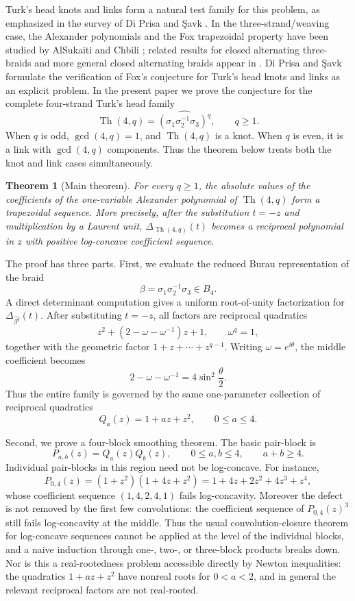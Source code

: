 \documentclass[11pt]{amsart}
\newtheorem{theorem}{Theorem}[section]
\newcommand{\Th}{\operatorname{Th}}
\begin{document}
Turk's head knots and links form a natural test family for this problem, as emphasized in the survey of Di Prisa and \c{S}avk \cite{diprisa-savk}.  In the three-strand/weaving case, the Alexander polynomials and the Fox trapezoidal property have been studied by AlSukaiti and Chbili \cite{alsukaiti-chbili-weaving}; related results for closed alternating three-braids and more general closed alternating braids appear in \cite{alrefai-chbili,alsukaiti-chbili-altbraids}.  Di Prisa and \c{S}avk formulate the verification of Fox's conjecture for Turk's head knots and links as an explicit problem.  In the present paper we prove the conjecture for the complete four-strand Turk's head family
\[
        \Th(4,q)=\widehat{(\sigma_1\sigma_2^{-1}\sigma_3)^q},
        \qquad q\ge1.
\]
When \(q\) is odd, \(\gcd(4,q)=1\), and \(\Th(4,q)\) is a knot.  When \(q\) is even, it is a link with \(\gcd(4,q)\) components.  Thus the theorem below treats both the knot and link cases simultaneously.

\begin{theorem}[Main theorem]\label{thm:global-intro}
For every \(q\ge1\), the absolute values of the coefficients of the one-variable Alexander polynomial of \(\Th(4,q)\) form a trapezoidal sequence.  More precisely, after the substitution \(t=-z\) and multiplication by a Laurent unit, \(\Delta_{\Th(4,q)}(t)\) becomes a reciprocal polynomial in \(z\) with positive log-concave coefficient sequence.
\end{theorem}

The proof has three parts.  First, we evaluate the reduced Burau representation of the braid
\[
        \beta=\sigma_1\sigma_2^{-1}\sigma_3\in B_4.
\]
A direct determinant computation gives a uniform root-of-unity factorization for \(\Delta_{\widehat{\beta^q}}(t)\).  After substituting \(t=-z\), all factors are reciprocal quadratics
\[
        z^2+\left(2-\omega-\omega^{-1}\right)z+1,
        \qquad \omega^q=1,
\]
together with the geometric factor \(1+z+\cdots+z^{q-1}\).  Writing \(\omega=e^{i\theta}\), the middle coefficient becomes
\[
        2-\omega-\omega^{-1}=4\sin^2\frac\theta2.
\]
Thus the entire family is governed by the same one-parameter collection of reciprocal quadratics
\[
        Q_a(z)=1+az+z^2,
        \qquad 0\le a\le4.
\]

Second, we prove a four-block smoothing theorem.  The basic pair-block is
\[
        P_{a,b}(z)=Q_a(z)Q_b(z),
        \qquad 0\le a,b\le4,
        \qquad a+b\ge4.
\]
Individual pair-blocks in this region need not be log-concave.  For instance,
\[
        P_{0,4}(z)=(1+z^2)(1+4z+z^2)
        =1+4z+2z^2+4z^3+z^4,
\]
whose coefficient sequence \((1,4,2,4,1)\) fails log-concavity.  Moreover the defect is not removed by the first few convolutions: the coefficient sequence of \(P_{0,4}(z)^3\) still fails log-concavity at the middle.  Thus the usual convolution-closure theorem for log-concave sequences cannot be applied at the level of the individual blocks, and a naive induction through one-, two-, or three-block products breaks down.  Nor is this a real-rootedness problem accessible directly by Newton inequalities: the quadratics \(1+az+z^2\) have nonreal roots for \(0<a<2\), and in general the relevant reciprocal factors are not real-rooted.
\end{document}
